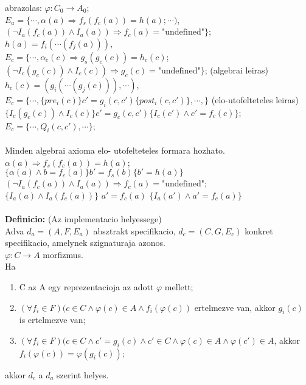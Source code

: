 \documentclass[a4paper,10pt]{article}
\begin{document}
abrazolas: $\varphi:C_0\to A_0$;\\
$E_a=\lbrace\cdots, \alpha(a) \Rightarrow f_s(f_c(a))=h(a); \cdots)$, $(\neg I_a(f_c(a)) \wedge I_a(a)) \Rightarrow f_c(a)=\text{"undefined"}\rbrace$;\\ $h(a)=f_i(\cdots(f_j(a)))$,\\
$E_c=\lbrace\cdots, \alpha_c(c) \Rightarrow g_s(g_c(c))=h_c(c)$; $(\neg I_c(g_c(c)) \wedge I_c(c)) \Rightarrow g_c(c)=\text{"undefined"}\rbrace$; (algebrai leiras)\\
$h_c(c)=(g_i(\cdots(g_j(c))),\cdots)$,\\
$E_c=\lbrace\cdots, \lbrace pre_i(c)\rbrace c'=g_i(c,c') \lbrace post_i(c,c')\rbrace, \cdots,\rbrace$ (elo-utofelteteles leiras)\\
$\lbrace I_c(g_c(c))\wedge I_c(c)\rbrace c'=g_c(c,c') \lbrace I_c(c') \wedge c'=f_c(c)\rbrace$;\\
$E_c=\lbrace\cdots, Q_i(c,c'),\cdots\rbrace$;\\ \\
Minden algebrai axioma elo- utofelteteles formara hozhato.\\
$\alpha(a)\Rightarrow f_s(f_c(a))=h(a)$;\\
$\lbrace\alpha(a)\wedge b=f_c(a)\rbrace b'=f_s(b) \lbrace b'=h(a)\rbrace$\\
$(\neg I_a(f_c(a))\wedge I_a(a)) \Rightarrow f_c(a) = \text{"undefined"}$;\\
$\lbrace I_a(a)\wedge I_a(f_c(a))\rbrace$ $a'=f_c(a)$ $\lbrace I_a(a') \wedge a'=f_c(a)\rbrace$\\ \\
\textbf{Definicio:} (Az implementacio helyessege)\\
Adva $d_a=(A, F, E_a)$ absztrakt specifikacio, $d_c=(C, G, E_c)$ konkret specifikacio, amelynek szignaturaja azonos.\\
$\varphi:C\to A$ morfizmus.\\
Ha
\begin{enumerate}
\item C az A egy reprezentacioja az adott $\varphi$ mellett;
\item $(\forall f_i\in F)(c\in C \wedge \varphi(c)\in A \wedge f_i(\varphi(c))$ ertelmezve van, akkor $g_i(c)$ is ertelmezve van;
\item $(\forall f_i\in F)(c\in C \wedge c'=g_i(c) \wedge c'\in C \wedge \varphi(c)\in A\wedge \varphi(c')\in A$, akkor $f_i(\varphi(c)) = \varphi(g_i(c))$;
\end{enumerate}
akkor $d_c$ a $d_a$ szerint helyes.\\
\end{document}
